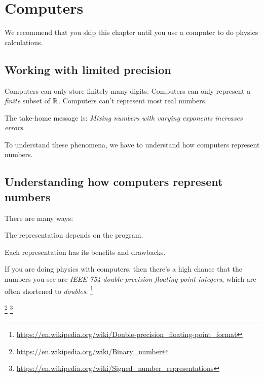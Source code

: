 \chapter{Computers}

We recommend that you skip this chapter
until you use a computer to do physics calculations.

\section{Working with limited precision}

Computers can only store finitely many digits.
Computers can only represent a \emph{finite} subset of \(\mathbb{R}\).
Computers can't represent most real numbers.

The take-home message is:
\emph{Mixing numbers with varying exponents increases errors}.

To understand these phenomena, we have to understand how computers represent numbers.

\section{Understanding how computers represent numbers}

There are many ways:

The representation depends on the program.

Each representation has its benefits and drawbacks.

If you are doing physics with computers,
then there's a high chance that the numbers you see are \emph{IEEE 754 double-precision floating-point integers},
which are often shortened to \emph{doubles}.%
\footnote{\url{https://en.wikipedia.org/wiki/Double-precision_floating-point_format}}

\footnote{\url{https://en.wikipedia.org/wiki/Binary_number}}%
\footnote{\url{https://en.wikipedia.org/wiki/Signed_number_representations}}

